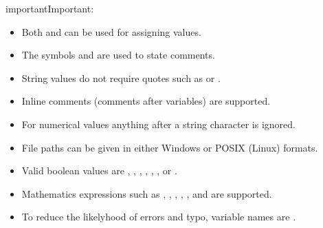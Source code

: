 \documentclass[letterpaper,10pt,english]{sphinxmanual}
\begin{document}
\begin{sphinxadmonition}{important}{Important:}\begin{itemize}
\item {} 
\sphinxAtStartPar
Both \sphinxcode{\sphinxupquote{=}} and \sphinxcode{\sphinxupquote{:}} can be used for assigning values.

\item {} 
\sphinxAtStartPar
The symbols \sphinxcode{\sphinxupquote{\#}} and \sphinxcode{\sphinxupquote{;}} are used to state comments.

\item {} 
\sphinxAtStartPar
String values do not require quotes such as  or \sphinxcode{\sphinxupquote{\textquotesingle{}}}.

\item {} 
\sphinxAtStartPar
In\sphinxhyphen{}line comments (comments after variables) are  supported.

\item {} 
\sphinxAtStartPar
For numerical values anything after a string character is ignored.

\item {} 
\sphinxAtStartPar
File paths can be given in either Windows or POSIX (Linux) formats.

\item {} 
\sphinxAtStartPar
Valid boolean values are , , , , , ,  or .

\item {} 
\sphinxAtStartPar
Mathematics expressions such as \sphinxcode{\sphinxupquote{+}}, \sphinxcode{\sphinxupquote{\sphinxhyphen{}}}, \sphinxcode{\sphinxupquote{*}}, \sphinxcode{\sphinxupquote{/}}, \sphinxcode{\sphinxupquote{//}}, \sphinxcode{\sphinxupquote{\textasciicircum{}}} and  are supported.

\item {} 
\sphinxAtStartPar
To reduce the likely\sphinxhyphen{}hood of errors and typo, variable names are .

\end{itemize}
\end{sphinxadmonition}
\end{document}
